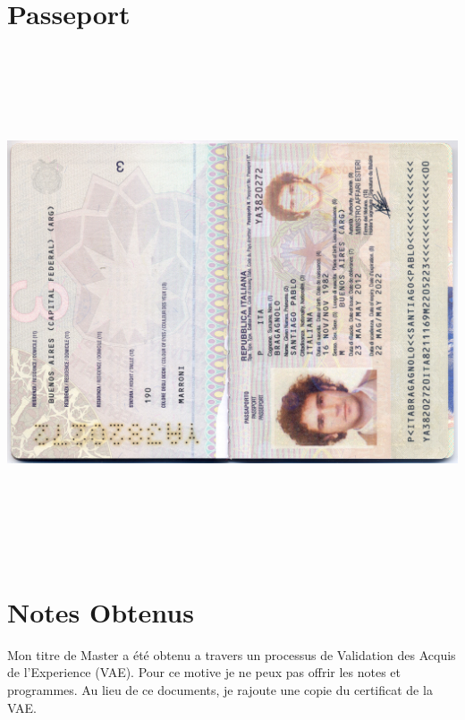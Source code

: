 \documentclass[11pt]{article} %
\begin{document}
\section{Passeport}
\includegraphics[width=15cm,height=15cm,keepaspectratio]{docs/Doc3-Passport.jpg}

\section {Notes Obtenus}
    Mon titre de Master a été obtenu a travers un processus de Validation des Acquis de l'Experience (VAE). Pour ce motive je ne peux pas offrir les notes et programmes. 
    Au lieu de ce documents, je rajoute une copie du certificat de la VAE. 
    
\end{document}
